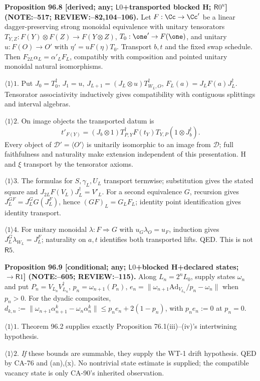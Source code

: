 \textbf{Proposition 96.8 [derived; any; \(\mathsf L0\)+transported blocked H; \(\mathsf R0^u\)] (NOTE:--517; REVIEW:--82,104--106).}
Let \(F:\Cc\to\Cc'\) be a linear dagger-preserving strong monoidal equivalence with unitary tensorators
\(T_{Y,Z}:F(Y)\otimes F(Z)\to F(Y\otimes Z)\), \(T_0:\one'\to F(\one)\), and unitary
\(u:F(O)\to O'\) with \(\eta'=uF(\eta)T_0\). Transport \(b,t\) and the fixed swap schedule.
Then \(F_{2L}\alpha_L=\alpha'_LF_L\), compatibly with composition and pointed unitary monoidal natural isomorphisms.
\par\(\langle1\rangle1\). Put \(J_0=T_0^\dagger\), \(J_1=u\),
\(J_{L+1}=(J_L\otimes u)T_{W_L,O}^\dagger\), \(F_L(a)=J_LF(a)J_L^\dagger\).
Tensorator associativity inductively gives compatibility with contiguous splittings and interval algebras.
\par\(\langle1\rangle2\). On image objects the transported datum is
\[
 t'_{F(Y)}=(J_b\otimes1)T_{P,Y}^\dagger F(t_Y)T_{Y,P}(1\otimes J_b^\dagger).
\]
Every object of \(\mathcal D'=\langle O'\rangle\) is unitarily isomorphic to an image from \(\mathcal D\);
full faithfulness and naturality make extension independent of this presentation. H and \(\xi\) transport by the tensorator axioms.
\par\(\langle1\rangle3\). The formulas for \(S,\gamma_L,U_L\) transport termwise; substitution gives the stated square
and \(J_{2L}F(V_L)J_L^\dagger=V'_L\). For a second equivalence \(G\), recursion gives
\(J_L^{GF}=J_L^G G(J_L^F)\), hence \((GF)_L=G_LF_L\); identity point identification gives identity transport.
\par\(\langle1\rangle4\). For unitary monoidal \(\lambda:F\Rightarrow G\) with \(u_G\lambda_O=u_F\), induction gives
\(J_L^G\lambda_{W_L}=J_L^F\); naturality on \(a,t\) identifies both transported lifts. QED. This is not \(\mathsf R5\).

\textbf{Proposition 96.9 [conditional; any; \(\mathsf L0\)+blocked H+declared states; \(\to\mathsf R1\)] (NOTE:--605; REVIEW:--115).}
Along \(L_n=2^nL_0\), supply states \(\omega_n\) and put \(P_n=V_{L_n}V_{L_n}^\dagger\), \(p_n=\omega_{n+1}(P_n)\),
\(e_n=\|\omega_{n+1}\mathrm{Ad}_{V_{L_n}}/p_n-\omega_n\|\) when \(p_n>0\). For the dyadic composites,
\(d_{k,n}:=\|\omega_{n+1}\alpha^k_{n+1}-\omega_n\alpha^k_n\|\le p_ne_n+2(1-p_n)\), with \(p_ne_n:=0\) at \(p_n=0\).
\par\(\langle1\rangle1\). Theorem 96.2 supplies exactly Proposition 76.1(iii)--(iv)'s intertwining hypothesis.
\par\(\langle1\rangle2\). \emph{If} these bounds are summable, they supply the WT-1 drift hypothesis. QED by
CA-76 and (an),(x). No nontrivial state estimate is supplied; the compatible vacancy state is only CA-90's inherited observation.

